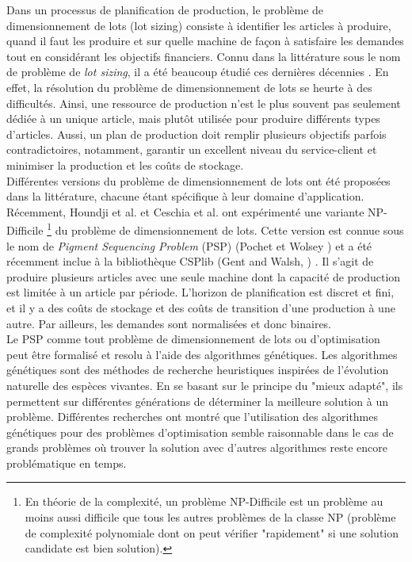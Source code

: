Dans un processus de planification de production, le problème de dimensionnement
de lots (lot sizing) consiste à identifier les articles à produire, quand il
faut les produire et sur quelle machine de façon à satisfaire les demandes
tout en considérant les objectifs financiers. Connu dans la
littérature sous le nom de problème de \emph{lot sizing}, il a été beaucoup étudié
ces dernières décennies \cite{cathy}. En effet, la résolution du problème de dimensionnement de lots se heurte à des difficultés. Ainsi, une ressource de production n'est le plus souvent pas seulement dédiée à un unique article, mais plutôt utilisée pour produire différents types d'articles. Aussi, un plan de production doit remplir plusieurs objectifs parfois contradictoires, notamment, garantir un excellent niveau du service-client et minimiser la production et les coûts de stockage. \\
	\hspace*{.5cm} Différentes versions du problème de dimensionnement de lots ont été proposées dans la littérature, chacune étant spécifique à leur domaine d'application. Récemment, Houndji et al. \cite{hvr_stockingCost} et Ceschia et al. \cite{opthub} ont expérimenté une variante NP-Difficile \footnote{En théorie de la complexité, un problème NP-Difficile est un problème au moins aussi difficile que tous les autres problèmes de la classe NP (problème de complexité polynomiale dont on peut vérifier "rapidement" si une solution candidate est bien solution)\cite{wikipedia_np_difficile}.} du problème de dimensionnement de lots. Cette version est connue sous le nom de \emph{Pigment Sequencing Problem} (PSP) (Pochet et Wolsey \cite{pochet_wolsey}) et a été récemment inclue à la bibliothèque CSPlib (Gent and Walsh, \cite{gent_walsh}) . Il s'agit de produire plusieurs articles avec une seule machine dont la capacité de production est limitée à un article par période. L'horizon de planification est discret et fini, et il y a des coûts de stockage et des coûts de transition d'une production à une autre. Par ailleurs, les demandes sont normalisées et donc binaires. \\
	\hspace*{.5cm} Le PSP comme tout problème de dimensionnement de lots ou d'optimisation peut être formalisé et resolu à l'aide des algorithmes génétiques. Les algorithmes génétiques sont des méthodes de recherche heuristiques inspirées de l'évolution naturelle des espèces vivantes. En se basant sur le principe du "mieux adapté", ils permettent sur différentes générations de déterminer la meilleure solution à un problème. Différentes recherches\cite{Goncalves} \cite{suer} ont montré que l'utilisation des algorithmes génétiques pour des problèmes d'optimisation semble raisonnable dans le cas de grands problèmes où trouver la solution avec d'autres algorithmes reste encore problématique en temps. 
	
